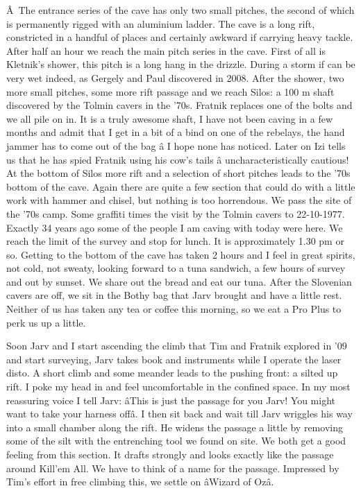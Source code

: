 Â~The entrance series of the cave has only two small pitches, the second
of which is permanently rigged with an aluminium ladder. The cave is a
long rift, constricted in a handful of places and certainly awkward if
carrying heavy tackle. After half an hour we reach the main pitch series
in the cave. First of all is Kletnik's shower, this pitch is a long hang
in the drizzle. During a storm if can be very wet indeed, as Gergely and
Paul discovered in 2008. After the shower, two more small pitches, some
more rift passage and we reach Silos: a 100 m shaft discovered by the
Tolmin cavers in the '70s. Fratnik replaces one of the bolts and we all
pile on in. It is a truly awesome shaft, I have not been caving in a few
months and admit that I get in a bit of a bind on one of the rebelays,
the hand jammer has to come out of the bag â I hope none has noticed.
Later on Izi tells us that he has spied Fratnik using his cow's tails
â uncharacteristically cautious! At the bottom of Silos more rift and
a selection of short pitches leads to the '70s bottom of the cave. Again
there are quite a few section that could do with a little work with
hammer and chisel, but nothing is too horrendous. We pass the site of
the '70s camp. Some graffiti times the visit by the Tolmin cavers to
22-10-1977. Exactly 34 years ago some of the people I am caving with
today were here. We reach the limit of the survey and stop for lunch. It
is approximately 1.30 pm or so. Getting to the bottom of the cave has
taken 2 hours and I feel in great spirits, not cold, not sweaty, looking
forward to a tuna sandwich, a few hours of survey and out by sunset. We
share out the bread and eat our tuna. After the Slovenian cavers are
off, we sit in the Bothy bag that Jarv brought and have a little rest.
Neither of us has taken any tea or coffee this morning, so we eat a Pro
Plus to perk us up a little.

Soon Jarv and I start ascending the climb that Tim and Fratnik explored
in '09 and start surveying, Jarv takes book and instruments while I
operate the laser disto. A short climb and some meander leads to the
pushing front: a silted up rift. I poke my head in and feel
uncomfortable in the confined space. In my most reassuring voice I tell
Jarv: âThis is just the passage for you Jarv! You might want to take
your harness offâ. I then sit back and wait till Jarv wriggles his way
into a small chamber along the rift. He widens the passage a little by
removing some of the silt with the entrenching tool we found on site. We
both get a good feeling from this section. It drafts strongly and looks
exactly like the passage around Kill'em All. We have to think of a name
for the passage. Impressed by Tim's effort in free climbing this, we
settle on âWizard of Ozâ.

